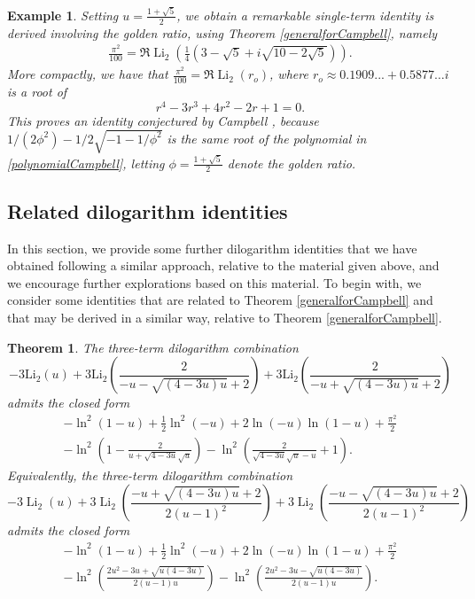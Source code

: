 \documentclass[12pt]{article}
\newtheorem{theorem}{Theorem}
\newtheorem{example}{Example}
\begin{document}
\begin{example}
 Setting $u = \frac{1+\sqrt{5}}{2}$, we obtain a remarkable single-term identity is derived involving the golden ratio, using Theorem 
 \ref{generalforCampbell}, namely 
\begin{equation*}
\begin{aligned}
 \frac{\pi^2}{100} = \Re \operatorname{Li}_2 \left( \frac{1}{4} \left(3 - \sqrt{5} + i \sqrt{10 - 2\sqrt{5}} \right) \right). 
\end{aligned}
\end{equation*}
 More compactly, we have that $\frac{\pi^2}{100} = 
 \Re \operatorname{Li}_2(r_o)$, where
 $ r_o \approx 0.1909... + 
 0.5877\ldots{i} $ is a root of 
\begin{equation}\label{polynomialCampbell}
 r^4 - 3r^3 + 4r^2 - 2r + 1 = 0.
\end{equation}
 This proves an identity conjectured by Campbell \cite{Campbell2025}, 
 because $1/(2\phi^2)- 1/2\sqrt{-1-1/\phi^2}$ is the same root of the polynomial in \eqref{polynomialCampbell}, 
 letting $\phi = \frac{1 + \sqrt{5}}{2}$ denote the golden ratio. 
\end{example}

\subsection{Related dilogarithm identities}
 In this section, we provide some further dilogarithm identities that we have obtained following a similar approach, relative to the 
 material given above, and we encourage further explorations based on this material. To begin with, we consider some identities that 
 are related to Theorem \ref{generalforCampbell} and that may be derived in a similar way, relative to Theorem \ref{generalforCampbell}. 

\begin{theorem}\label{previously8p1}
 The three-term dilogarithm combination 
$$ - 3\mathrm{Li}_2(u) + 3\mathrm{Li}_2\left(\frac{2}{-u - \sqrt{(4 - 3u) u} + 2}\right) 
+ 3\mathrm{Li}_2\left(\frac{2}{-u + \sqrt{(4 - 3u) u} + 2}\right) $$
 admits the closed form 
\begin{multline*}
 -\ln^2(1 - u) + \frac{1}{2} \ln^2(-u) + 2\ln(-u) \ln(1 - u) + \frac{\pi^2}{2}\\
- \ln^2\left(1 - \frac{2}{u + \sqrt{4 - 3u} \sqrt{u}}\right) 
- \ln^2\left(\frac{2}{\sqrt{4 - 3u} \sqrt{u} - u} + 1\right). 
\end{multline*}
 Equivalently, the three-term dilogarithm combination 
 $$ -3 \operatorname{Li}_2(u) 
 + 3 \operatorname{Li}_2\left(\frac{-u + \sqrt{(4 - 3 u) u} + 2}{2 (u - 1)^2}\right) 
 + 3 \operatorname{Li}_2\left(\frac{-u - \sqrt{(4 - 3 u) u} + 2}{2 (u - 1)^2}\right) $$ 
 admits the closed form 
\begin{multline*}
 - \ln^2(1 - u) + \frac{1}{2} \ln^2(-u) + 2 \ln(-u) \ln(1 - u) + \frac{\pi^2}{2} \\ 
 - \ln^2\left(\frac{2 u^2 - 3 u + \sqrt{u (4-3u)}}{2 (u - 1) u}\right) 
- \ln^2\left(\frac{2 u^2 - 3 u - \sqrt{u (4-3u)}}{2 (u - 1) u}\right). 
\end{multline*}
\end{theorem}
\end{document}
